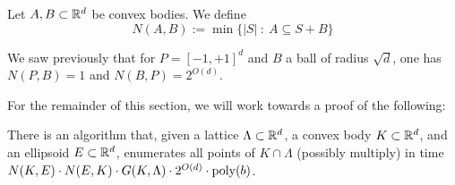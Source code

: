 \begin{definition}
  Let $A, B \subset \mathbb{R}^d$ be convex bodies.
  We define
  \[
    N(A,B) := \min\{ |S| ~:~ A \subseteq S + B \}
  \]
\end{definition}

\begin{example}
  We saw previously that for $P = [-1,+1]^d$ and $B$ a ball of radius $\sqrt{d}$,
  one has $N(P,B) = 1$ and $N(B,P) = 2^{O(d)}$.
\end{example}

For the remainder of this section, we will work towards a proof of the following:
\begin{theorem}
  \label{thm:enumerate-in-K-given-E}
  There is an algorithm that, given a lattice $\Lambda \subset \mathbb{R}^d$,
  a convex body $K \subset \mathbb{R}^d$, and an ellipsoid $E \subset \mathbb{R}^d$,
  enumerates all points of $K \cap \Lambda$ (possibly multiply)
  in time $N(K,E) \cdot N(E,K) \cdot G(K,\Lambda) \cdot 2^{O(d)} \cdot \operatorname{poly}(b)$.
\end{theorem}

